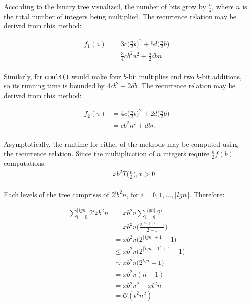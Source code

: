 \documentclass[usletter, 12pt]{article}
\begin{document}
        According to the binary tree visualized, the number of bits grow by $\frac{n}{2}$, where $n$ is the total number of integers being multiplied. The recurrence relation may be derived from this method:

        \begin{equation*}
            \begin{split}
                f_1(n) & = 3c \Bigg( \frac{n}{2}b \Bigg)^2 + 5d \Bigg(\frac{n}{2}b \Bigg) \\
                & = \frac{3}{4}cb^2n^2+\frac{5}{2}dbn \\
            \end{split}
        \end{equation*}

        Similarly, for \texttt{cmul4()} would make four $b$-bit multiplies and two $b$-bit additions, so its running time is bounded by $4cb^2+2db$. The recurrence relation may be derived from this method:

        \begin{equation*}
            \begin{split}
                f_2(n) & = 4c \Bigg( \frac{n}{2}b \Bigg)^2 + 2d \Bigg(\frac{n}{2}b \Bigg) \\
                & = cb^2n^2+dbn \\
            \end{split}
        \end{equation*}

        Asymptotically, the runtime for either of the methods may be computed using the recurrence relation. Since the multiplication of $n$ integers require $\frac{n}{2}f(b)$ computations:
        \begin{equation*}
            \begin{split}
                & = xb^2T \bigg(\frac{n}{2}\bigg), x > 0 \\
            \end{split}
        \end{equation*}

        Each levels of the tree comprises of $2^ib^2n$, for $i = 0, 1, \ldots, \lceil lgn\rceil$. Therefore:

        \begin{equation*}
            \begin{split}
                \sum_{i=0}^{\lceil lgn\rceil} 2^ixb^2n & = xb^2n\sum_{i=0}^{\lceil lgn\rceil} 2^i \\
                & = xb^2n \bigg(\frac{2^{\lceil lgn\rceil+1}-1}{2-1}\bigg) \\
                & = xb^2n \bigg(2^{\lceil lgn\rceil+1}-1\bigg) \\
                & \leq xb^2n \bigg(2^{\lceil lgn+1\rceil+1}-1\bigg) \\
                & \approx xb^2n \big(2^{lgn}-1\big) \\
                & = xb^2n (n-1) \\
                & = xb^2n^2 - xb^2n \\
                & = \mathcal{O}(b^2n^2) \\
            \end{split}
        \end{equation*}
\end{document}
